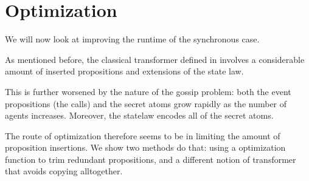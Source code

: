 \section{Optimization}\label{sec:Optimization}

We will now look at improving the runtime of the synchronous case.

As mentioned before, the classical transformer defined in \cite{GattingerThesis2018}
involves a considerable amount of inserted propositions and extensions of the state law.

This is further worsened by the nature of the gossip problem:
both the event propositions (the calls) and the secret atoms grow rapidly as the number of agents increases.
Moreover, the statelaw encodes all of the secret atoms.

The route of optimization therefore seems to be in limiting the amount of proposition insertions.
We show two methods do that: using a optimization function to trim redundant propositions,
and a different notion of transformer that avoids copying alltogether.